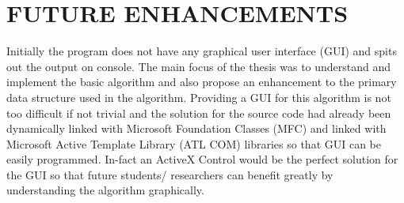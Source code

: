 %

\chapter{FUTURE ENHANCEMENTS}
\label{chap:enhancements}

Initially the program does not have any graphical user interface (GUI) and spits out the output on console. The main focus of the thesis was to understand and implement the basic algorithm and also propose an enhancement to the primary data structure used in the algorithm. Providing a GUI for this algorithm is not too difficult if not trivial and the solution for the source code had already been dynamically linked with Microsoft Foundation Classes (MFC) and linked with Microsoft Active Template Library (ATL COM) libraries so that GUI can be easily programmed. In-fact an ActiveX Control would be the perfect solution for the GUI so that future students/ researchers can benefit greatly by understanding the algorithm graphically.


